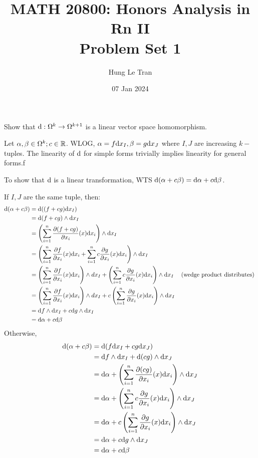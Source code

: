 \documentclass[a4paper, 12pt]{article}
\title{MATH 20800: Honors Analysis in Rn II \\ \large Problem Set 1}
\date{07 Jan 2024}
\author{Hung Le Tran}
\begin{document}
\maketitle
\setcounter{section}{1}
\begin{problem} 
    Show that $\mathrm{d}: \Omega^k \to \Omega^{k+1}$ is a linear vector space homomorphism.
\end{problem}
\begin{solution}
    Let $\alpha, \beta \in \Omega^k; c \in \mathbb{R}$. WLOG, $\alpha = f \mathrm{d} x_{I}, \beta = g \mathrm{d} x_{J}$ where $I, J$ are increasing $k-$tuples. The linearity of $\mathrm{d}$ for simple forms trivially implies linearity for general forms.f

    To show that $\mathrm{d}$ is a linear transformation, WTS $\mathrm{d} (\alpha + c \beta) = \mathrm{d} \alpha + c \mathrm{d} \beta$.

    If $I, J$ are the same tuple, then: \begin{align*} 
        \mathrm{d}(\alpha + c \beta) &= \mathrm{d} ((f + cg) \mathrm{d} x_I) \\
        &= \mathrm{d} (f + cg) \wedge \mathrm{d} x_I \\
        &= \left(\sum_{i=1}^{n} \frac{\partial (f + cg)}{\partial x_i}(x) \mathrm{d} x_i\right) \wedge \mathrm{d} x_I \\
        &= \left(\sum_{i=1}^{n} \frac{\partial f}{\partial x_i}(x) \mathrm{d} x_i + \sum_{i=1}^{n} c \frac{\partial g}{\partial x_i}(x) \mathrm{d} x_i\right) \wedge \mathrm{d} x_I \\
        &= \left(\sum_{i=1}^{n} \frac{\partial f}{\partial x_i}(x) \mathrm{d} x_i \right) \wedge dx_I + \left(\sum_{i=1}^{n} c \frac{\partial g}{\partial x_i}(x) \mathrm{d} x_i\right) \wedge \mathrm{d} x_I \quad \:\text{(wedge product distributes)}\: \\
        &= \left(\sum_{i=1}^{n} \frac{\partial f}{\partial x_i}(x) \mathrm{d} x_i \right) \wedge dx_I + c\left(\sum_{i=1}^{n}\frac{\partial g}{\partial x_i}(x) \mathrm{d} x_i\right) \wedge \mathrm{d} x_I \\
        &= \mathrm{d} f \wedge \mathrm{d} x_I + c \mathrm{d} g \wedge \mathrm{d} x_I \\
        &= \mathrm{d} \alpha + c \mathrm{d} \beta
    \end{align*}
    Otherwise,
    \begin{align*}
        \mathrm{d} (\alpha + c \beta ) &= \mathrm{d} (f \mathrm{d} x_I + cg \mathrm{d} x_J) \\
        &= \mathrm{d} f \wedge \mathrm{d} x_I + \mathrm{d} (cg) \wedge \mathrm{d} x_J \\
        &= \mathrm{d} \alpha + \left( \sum_{i=1}^{n} \frac{\partial (cg)}{\partial x_i} (x) \mathrm{d} x_i \right) \wedge \mathrm{d} x_J \\
        &= \mathrm{d} \alpha + \left(\sum_{i=1}^{n} c \frac{\partial g}{\partial x_i}(x) \mathrm{d} x_i \right) \wedge \mathrm{d} x_J \\
        &= \mathrm{d} \alpha + c \left(\sum_{i=1}^{n} \frac{\partial g}{\partial x_i}(x) \mathrm{d} x_i \right) \wedge \mathrm{d} x_J \\
        &= \mathrm{d} \alpha + c \mathrm{d} g \wedge \mathrm{d} x_J \\
        &= \mathrm{d} \alpha + c \mathrm{d} \beta
    \end{align*}
\end{solution}
\end{document}
